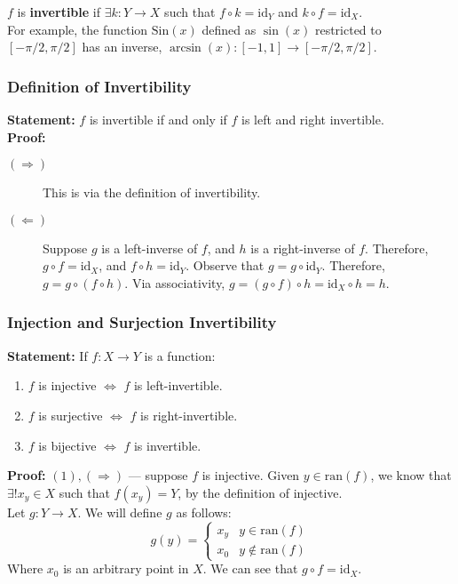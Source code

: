 \documentclass[10pt]{extarticle}
\begin{document}
      $f$ is \textbf{invertible} if $\exists k:Y\rightarrow X$ such that $f\circ k = \text{id}_Y$ and $k\circ f = \text{id}_X$.\\

      For example, the function $\text{Sin}(x)$ defined as $\sin(x)$ restricted to $[-\pi/2,\pi/2]$ has an inverse, $\arcsin(x):[-1,1] \rightarrow [-\pi/2,\pi/2]$.
      \subsubsection{Definition of Invertibility}%
      \textbf{Statement:} $f$ is invertible if and only if $f$ is left and right invertible.\\

    \textbf{Proof:}
    \begin{description}
      \item[$(\Rightarrow)$] This is via the definition of invertibility.
      \item[$(\Leftarrow)$] Suppose $g$ is a left-inverse of $f$, and $h$ is a right-inverse of $f$. Therefore, $g\circ f = \text{id}_X$, and $f\circ h = \text{id}_Y$. Observe that $g = g\circ \text{id}_Y$. Therefore, $g = g\circ(f\circ h)$. Via associativity, $g = (g\circ f)\circ h = \text{id}_X \circ h = h$.
    \end{description}
      \subsubsection{Injection and Surjection Invertibility}%
      \textbf{Statement:} If $f:X\rightarrow Y$ is a function:
      \begin{enumerate}[(1)]
      \item $f$ is injective $\Leftrightarrow$ $f$ is left-invertible.
      \item $f$ is surjective $\Leftrightarrow$ $f$ is right-invertible.
      \item $f$ is bijective $\Leftrightarrow$ $f$ is invertible.
    \end{enumerate}
    \textbf{Proof:} $(1),(\Rightarrow)$ --- suppose $f$ is injective. Given $y\in \text{ran}(f)$, we know that $\exists! x_y\in X$ such that $f(x_y) = Y$, by the definition of injective.\\

    Let $g:Y\rightarrow X$. We will define $g$ as follows:
    \[
      g(y) = \begin{cases}
        x_y & y\in \text{ran}(f) \\
        x_0 & y\notin \text{ran}(f)
      \end{cases}
    \] 
    Where $x_0$ is an arbitrary point in $X$. We can see that $g\circ f = \text{id}_X$.\\
\end{document}
